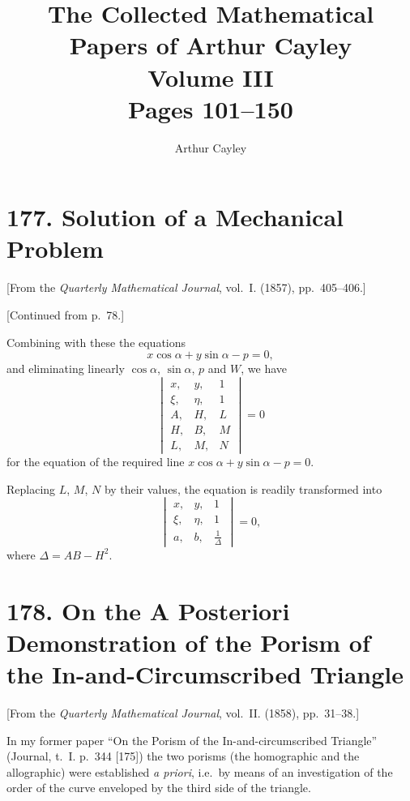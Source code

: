\documentclass[12pt,a4paper]{article}
\title{The Collected Mathematical Papers of Arthur Cayley\\Volume III\\Pages 101--150}
\author{Arthur Cayley}
\date{}
\theoremstyle{plain}
\theoremstyle{definition}
\begin{document}
\maketitle
\tableofcontents
\newpage


\section*{177. Solution of a Mechanical Problem}

[From the \textit{Quarterly Mathematical Journal}, vol.~I. (1857), pp.~405--406.]

[Continued from p.~78.]

Combining with these the equations
\[
x \cos \alpha + y \sin \alpha - p = 0,
\]
and eliminating linearly $\cos \alpha$, $\sin \alpha$, $p$ and $W$, we have
\[
\begin{vmatrix}
x, & y, & 1 \\
\xi, & \eta, & 1 \\
A, & H, & L \\
H, & B, & M \\
L, & M, & N
\end{vmatrix} = 0
\]
for the equation of the required line $x \cos \alpha + y \sin \alpha - p = 0$.

Replacing $L$, $M$, $N$ by their values, the equation is readily transformed into
\[
\begin{vmatrix}
x, & y, & 1 \\
\xi, & \eta, & 1 \\
a, & b, & \frac{1}{\Delta}
\end{vmatrix} = 0,
\]
where $\Delta = AB - H^2$.


\newpage
\section*{178. On the A Posteriori Demonstration of the Porism of the In-and-Circumscribed Triangle}

[From the \textit{Quarterly Mathematical Journal}, vol.~II. (1858), pp.~31--38.]

In my former paper ``On the Porism of the In-and-circumscribed Triangle'' (Journal, t.~I. p.~344 [175]) the two porisms (the homographic and the allographic) were established \textit{a priori}, i.e.\ by means of an investigation of the order of the curve enveloped by the third side of the triangle.
\end{document}
